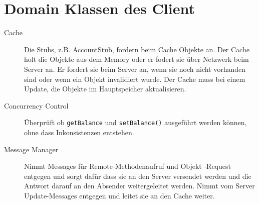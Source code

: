 \section{Domain Klassen des Client}
\label{sec:domain-klassen}

\begin{description}
\item[Cache] Die Stubs, z.B. AccountStub, fordern beim Cache Objekte an. Der Cache holt die Objekte aus dem Memory oder er fodert sie über Netzwerk beim Server an. Er fordert sie beim Server an, wenn sie noch nicht vorhanden sind oder wenn ein Objekt invalidiert wurde. Der Cache muss bei einem Update, die Objekte im Hauptspeicher aktualisieren.
\item[Concurrency Control] Überprüft ob \verb+getBalance+ und \verb+setBalance()+ ausgeführt werden können, ohne dass Inkonsistenzen entstehen.

\item[Message Manager] Nimmt Messages für Remote-Methodenaufruf und Ob\-jekt\- -Request entgegen und sorgt dafür dass sie an den Server versendet werden und die Antwort darauf an den Absender weitergeleitet werden. Nimmt vom Server Update-Messages entgegen und leitet sie an den Cache weiter.

\end{description}

